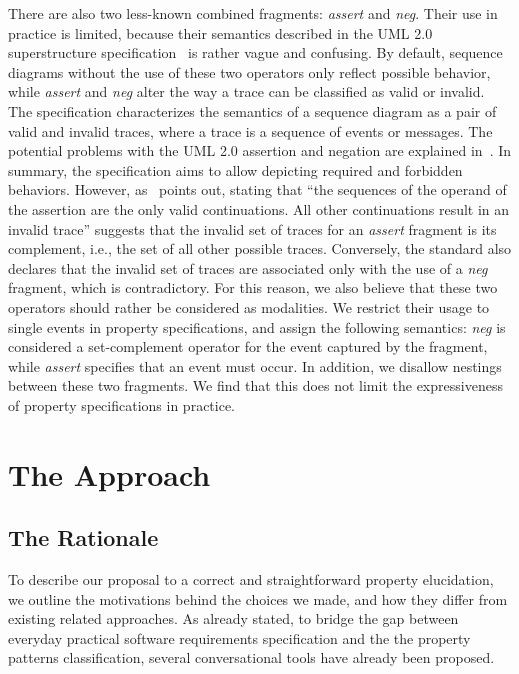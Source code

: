 \documentclass[letter]{llncs}
\begin{document}
There are also two less-known combined fragments: \emph{assert} and \emph{neg}. Their use in practice
is limited, because their semantics described in the UML 2.0 superstructure specification~\cite{UML2.4_superstructure}
is rather vague and confusing. By default, sequence diagrams without the use of these two operators 
only reflect possible behavior, while \emph{assert} and \emph{neg} alter the way 
a trace can be classified as valid or invalid. The specification characterizes
the semantics of a sequence diagram as a pair of valid and invalid traces,
where a trace is a sequence of events or messages.
The potential problems with the UML 2.0 assertion and negation are explained in~\cite{Harel07assertand}.
In summary, the specification aims to allow depicting required and forbidden behaviors.
However, as~\cite{Harel07assertand} points out, stating that ``the sequences of the operand of the assertion are the only valid continuations. All other continuations result in an invalid trace''
suggests that the invalid set of traces for an \emph{assert} fragment is its complement, i.e., the set of all other possible traces.
Conversely, the standard also declares that the
invalid set of traces are associated only with the use of
a \emph{neg} fragment, which is contradictory.
For this reason, we also believe that these two operators should rather be considered 
as modalities. We restrict their usage to single events in property specifications, and assign the following semantics:
\emph{neg} is considered a set-complement operator for the event captured by the fragment, while \emph{assert}
specifies that an event must occur. In addition, we
disallow nestings between these two fragments.
We find that this does not limit the expressiveness of property specifications in practice.
\vspace{-8 pt}
\section{The Approach}
\label{sec:Approach}
\vspace{-7 pt}

\subsection{The Rationale}
\vspace{-7 pt}
To describe our proposal to a correct and straightforward property elucidation,
we outline the motivations behind the choices we made, and how they differ from
existing related approaches. As already stated, to bridge the gap between everyday practical software 
requirements specification and the the property patterns classification,
several conversational tools have already been proposed. 
\end{document}

